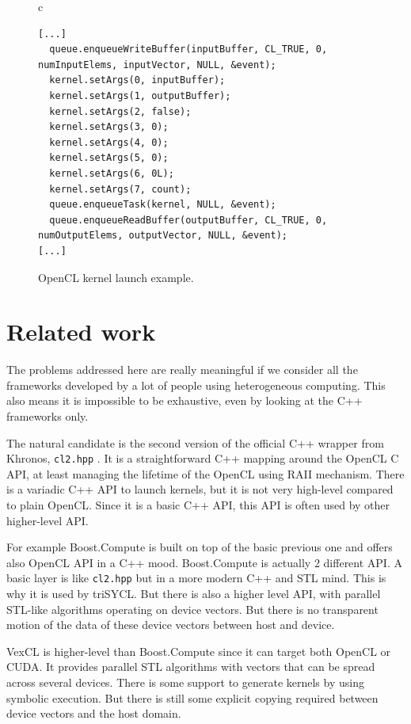 \documentclass[sigplan]{acmart}
\begin{document}
\begin{figure}
  \begin{tabular}{c}
    \begin{lstlisting}[basicstyle=\scriptsize]
[...]
  queue.enqueueWriteBuffer(inputBuffer, CL_TRUE, 0, numInputElems, inputVector, NULL, &event);
  kernel.setArgs(0, inputBuffer);
  kernel.setArgs(1, outputBuffer);
  kernel.setArgs(2, false);
  kernel.setArgs(3, 0);
  kernel.setArgs(4, 0);
  kernel.setArgs(5, 0);
  kernel.setArgs(6, 0L);
  kernel.setArgs(7, count);
  queue.enqueueTask(kernel, NULL, &event);
  queue.enqueueReadBuffer(outputBuffer, CL_TRUE, 0, numOutputElems, outputVector, NULL, &event);
[...]
\end{lstlisting}
\end{tabular}
\caption{OpenCL kernel launch example.}
\label{fig:openclbnn}
\end{figure}


\section{Related work}
\label{sec:related-work}

The problems addressed here are really meaningful if we consider all
the frameworks developed by a lot of people using heterogeneous
computing. This also means it is impossible to be exhaustive, even by
looking at the C++ frameworks only.

The natural candidate is the second version of the official C++
wrapper from Khronos, \texttt{cl2.hpp} \cite{cl2.hpp}. It is a
straightforward C++ mapping around the OpenCL C API, at least managing
the lifetime of the OpenCL using RAII mechanism. There is a variadic
C++ API to launch kernels, but it is not very high-level compared
to plain OpenCL. Since it is a basic C++ API, this API is often
used by other higher-level API.

For example Boost.Compute \cite{Boost.Compute} is built on top of the
basic previous one and offers also OpenCL API in a C++ mood.
Boost.Compute is actually 2 different API. A basic layer is like
\texttt{cl2.hpp} but in a more modern C++ and STL mind. This is why it
is used by triSYCL. But there is also a higher level API, with
parallel STL-like algorithms operating on device vectors. But there is
no transparent motion of the data of these device vectors between host
and device.

VexCL \cite{VexCL} is higher-level than Boost.Compute since it can
target both OpenCL or CUDA. It provides parallel STL algorithms with
vectors that can be spread across several devices. There is some
support to generate kernels by using symbolic execution. But there is
still some explicit copying required between device vectors and the host domain.
\end{document}
